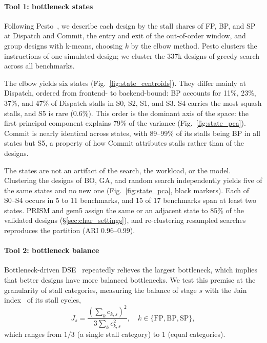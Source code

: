 \paragraph{Tool 1: bottleneck states}
Following Pesto~\cite{pesto}, we describe each design by the stall shares of FP, BP, and SP at Dispatch and Commit, the entry and exit of the out-of-order window, and group designs with k-means, choosing $k$ by the elbow method.
%
Pesto clusters the instructions of one simulated design; we cluster the 337k designs of greedy search across all benchmarks.

The elbow yields six states (Fig.~\ref{fig:state_centroids}).
%
They differ mainly at Dispatch, ordered from frontend- to backend-bound: BP accounts for 11\%, 23\%, 37\%, and 47\% of Dispatch stalls in S0, S2, S1, and S3.
%
S4 carries the most squash stalls, and S5 is rare (0.6\%).
%
This order is the dominant axis of the space: the first principal component explains 79\% of the variance (Fig.~\ref{fig:state_pca}).
%
Commit is nearly identical across states, with 89--99\% of its stalls being BP in all states but S5, a property of how Commit attributes stalls rather than of the designs.

The states are not an artifact of the search, the workload, or the model.
%
Clustering the designs of BO, GA, and random search independently yields five of the same states and no new one (Fig.~\ref{fig:state_pca}, black markers).
%
Each of S0--S4 occurs in 5 to 11 benchmarks, and 15 of 17 benchmarks span at least two states.
%
PRISM and gem5 assign the same or an adjacent state to 85\% of the validated designs (\S\ref{sec:char_settings}), and re-clustering resampled searches reproduces the partition (ARI 0.96--0.99).

\paragraph{Tool 2: bottleneck balance}
Bottleneck-driven DSE~\cite{archexplorer} repeatedly relieves the largest bottleneck, which implies that better designs have more balanced bottlenecks.
%
We test this premise at the granularity of stall categories, measuring the balance of stage $s$ with the Jain index~\cite{jain1984} of its stall cycles,
\begin{equation}
J_s = \frac{\left(\sum_{k} c_{k,s}\right)^2}{3\sum_{k} c_{k,s}^2}, \quad k \in \{\mathrm{FP}, \mathrm{BP}, \mathrm{SP}\},
\end{equation}
which ranges from $1/3$ (a single stall category) to 1 (equal categories).

